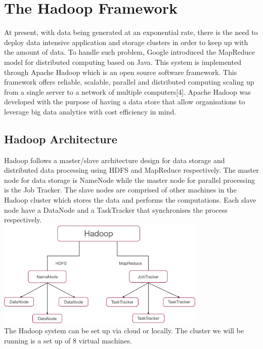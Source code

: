 \documentclass[11pt]{book}
\begin{document}
\section{The Hadoop Framework}

At present, with data being generated at an exponential rate, there is the need to deploy data intensive application and storage clusters in order to keep up with the amount of data. To handle such problem, Google introduced the MapReduce model for distributed computing based on Java. This system is implemented through Apache Hadoop which is an open source software framework. This framework offers reliable, scalable, parallel and distributed computing scaling up from a single server to a network of multiple computers[4]. Apache Hadoop was developed with the purpose of having a data store that allow organisations to leverage big data analytics with cost efficiency in mind.\\


\subsection{Hadoop Architecture}

Hadoop follows a master/slave architecture design for data storage and distributed data processing using HDFS and MapReduce respectively. The master node for data storage is NameNode while the master node for parallel processing is the Job Tracker. The slave nodes are comprised of other machines in the Hadoop cluster which stores the data and performs the computations. Each slave node have a DataNode and a TaskTracker that synchronises the process respectively. \\

 \includegraphics[width=10cm]{hadoop}\\

The Hadoop system can be set up via cloud or locally. The cluster we will be running is a set up of 8 virtual machines.
\end{document}
